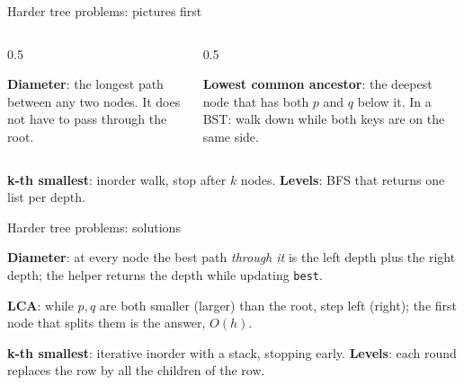 \documentclass[aspectratio=169,10pt]{beamer}
\newcommand{\fA}{white}\newcommand{\fB}{white}\newcommand{\fC}{white}\newcommand{\fD}{white}
\newcommand{\fE}{white}\newcommand{\fF}{white}\newcommand{\fG}{white}
\newcommand{\wideshape}[9]{%
  \node[tn,fill=\fA] (a) at (0,0) {#1};
  \node[tn,fill=\fB] (b) at (-2.6,-1.1) {#2};  \node[tn,fill=\fC] (c) at (2.6,-1.1) {#3};
  \node[tn,fill=\fD] (d) at (-3.9,-2.2) {#4};  \node[tn,fill=\fE] (e) at (-1.3,-2.2) {#5};
  \node[tn,fill=\fF] (f) at (1.3,-2.2) {#6};   \node[tn,fill=\fG] (g) at (3.9,-2.2) {#7};
  \node[tn,fill=\fH] (h) at (-2.2,-3.3) {#8};  \node[tn,fill=\fI] (i) at (-0.4,-3.3) {#9};
  \foreach \p/\q in {a/b,a/c,b/d,b/e,c/f,c/g,e/h,e/i}{\draw[tdInk!60] (\p) -- (\q);}}
\newcommand{\fH}{white}\newcommand{\fI}{white}
\begin{document}
\begin{frame}{Harder tree problems: pictures first}
\begin{columns}[T]
\begin{column}{0.5\textwidth}
\begin{sfig}[0.42]
\end{sfig}
{\small \textbf{Diameter}: the longest path between any two nodes. It does not have to pass through the root.}
\end{column}
\begin{column}{0.5\textwidth}
\begin{sfig}[0.42]
\end{sfig}
{\small \textbf{Lowest common ancestor}: the deepest node that has both $p$ and $q$ below it. In a BST: walk down while both keys are on the same side.}
\end{column}
\end{columns}
\vspace{2mm}
{\small \textbf{k-th smallest}: inorder walk, stop after $k$ nodes. \textbf{Levels}: BFS that returns one list per depth.}
\end{frame}

\begin{frame}[allowframebreaks]{Harder tree problems: solutions}
\vspace{1mm}
\framebreak
\pycode[\fontsize{7.4}{8.8}\selectfont]{h_kth}
\vspace{1mm}
\pycode[\fontsize{7.4}{8.8}\selectfont]{h_levels}
\framebreak
{}
\vspace{2mm}
{\small
\textbf{Diameter}: at every node the best path \emph{through it} is the left depth plus the right depth; the helper returns the depth while updating \texttt{best}.

\vspace{1mm}
\textbf{LCA}: while $p,q$ are both smaller (larger) than the root, step left (right); the first node that splits them is the answer, $O(h)$.

\vspace{1mm}
\textbf{k-th smallest}: iterative inorder with a stack, stopping early. \textbf{Levels}: each round replaces the row by all the children of the row.}
\end{frame}
\end{document}
